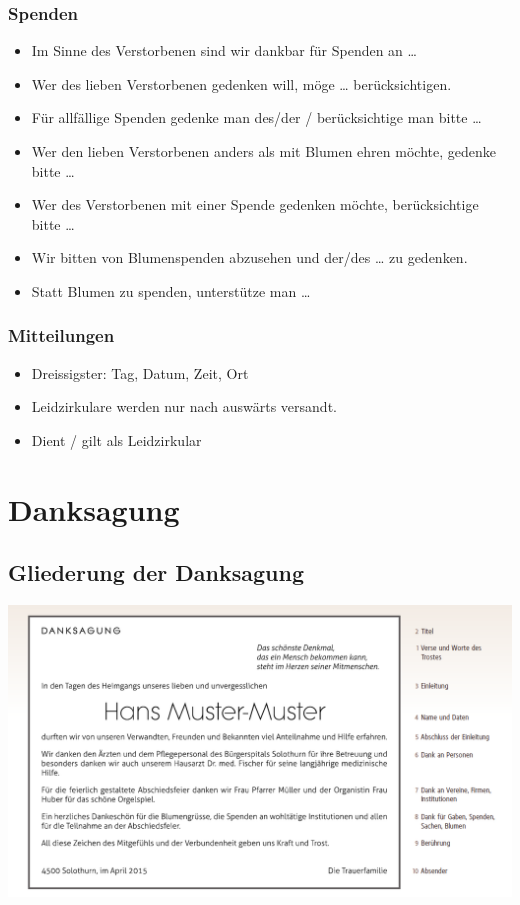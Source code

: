 \documentclass[ngerman,a4paper,11pt]{scrreprt}
\begin{document}
\section{Spenden}
\label{sec-1-1-11}

\begin{itemize}
\item Im Sinne des Verstorbenen sind wir dankbar für Spenden an \ldots{}
\item Wer des lieben Verstorbenen gedenken will, möge \ldots{} berücksichtigen.
\item Für allfällige Spenden gedenke man des/der / berücksichtige man bitte \ldots{}
\item Wer den lieben Verstorbenen anders als mit Blumen ehren möchte, gedenke
bitte \ldots{}
\item Wer des Verstorbenen mit einer Spende gedenken möchte, berücksichtige
bitte \ldots{}
\item Wir bitten von Blumenspenden abzusehen und der/des \ldots{} zu gedenken.
\item Statt Blumen zu spenden, unterstütze man \ldots{}
\end{itemize}

\section{Mitteilungen}
\label{sec-1-1-12}

\begin{itemize}
\item Dreissigster: Tag, Datum, Zeit, Ort
\item Leidzirkulare werden nur nach auswärts versandt.
\item Dient / gilt als Leidzirkular
\end{itemize}

\part{Danksagung}
\label{sec-2}

\chapter{Gliederung der Danksagung}
\label{sec-2-1}

\includegraphics[width=\textwidth]{Bilder/MusterDanksagung.png}
\end{document}
